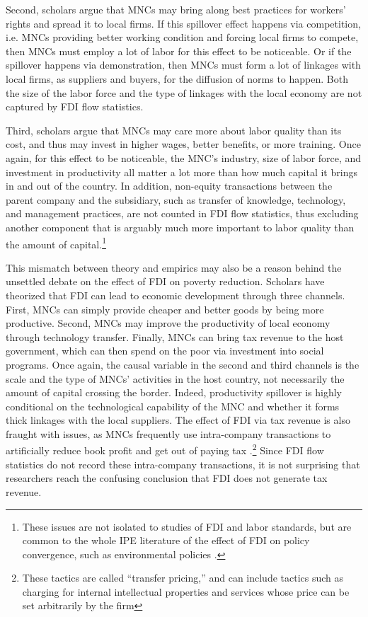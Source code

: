 Second, scholars argue that MNCs may bring along best practices for workers'
rights and spread it to local firms. If this spillover effect happens via
competition, i.e. MNCs providing better working condition and forcing local
firms to compete, then MNCs must employ a lot of labor for this effect to be
noticeable. Or if the spillover happens via demonstration, then MNCs must form a
lot of linkages with local firms, as suppliers and buyers, for the diffusion of
norms to happen. Both the size of the labor force and the type of linkages with
the local economy are not captured by FDI flow statistics.

Third, scholars argue that MNCs may care more about labor quality than its cost,
and thus may invest in higher wages, better benefits, or more training. Once
again, for this effect to be noticeable, the MNC's industry, size of labor
force, and investment in productivity all matter a lot more than how much
capital it brings in and out of the country. In addition, non-equity
transactions between the parent company and the subsidiary, such as transfer of
knowledge, technology, and management practices, are not counted in FDI flow
statistics, thus excluding another component that is arguably much more
important to labor quality than the amount of capital.\footnote{These issues are
  not isolated to studies of FDI and labor standards, but are common to the
  whole IPE literature of the effect of FDI on policy convergence, such as
  environmental policies \citep{Prakash2007}.}

This mismatch between theory and empirics may also be a reason behind the
unsettled debate on the effect of FDI on poverty reduction. Scholars have
theorized that FDI can lead to economic development through three channels.
First, MNCs can simply provide cheaper and better goods by being more
productive. Second, MNCs may improve the productivity of local economy through
technology transfer. Finally, MNCs can bring tax revenue to the host government,
which can then spend on the poor via investment into social programs. Once
again, the causal variable in the second and third channels is the scale and the
type of MNCs' activities in the host country, not necessarily the amount of
capital crossing the border. Indeed, productivity spillover is highly
conditional on the technological capability of the MNC and whether it forms
thick linkages with the local suppliers. The effect of FDI via tax revenue is
also fraught with issues, as MNCs frequently use intra-company transactions to
artificially reduce book profit and get out of paying tax
\citep{Malesky2015c}.\footnote{These tactics are called ``transfer pricing,''
  and can include tactics such as charging for internal intellectual properties
  and services whose price can be set arbitrarily by the firm} Since FDI flow
statistics do not record these intra-company transactions, it is not surprising
that researchers reach the confusing conclusion that FDI does not generate tax
revenue.

